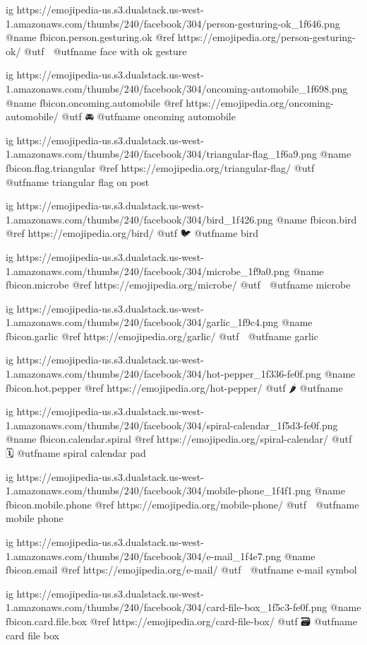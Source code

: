   ig https://emojipedia-us.s3.dualstack.us-west-1.amazonaws.com/thumbs/240/facebook/304/person-gesturing-ok_1f646.png
  @name fbicon.person.gesturing.ok
  @ref https://emojipedia.org/person-gesturing-ok/
  @utf 🙆
  @utfname face with ok gesture

  ig https://emojipedia-us.s3.dualstack.us-west-1.amazonaws.com/thumbs/240/facebook/304/oncoming-automobile_1f698.png
  @name fbicon.oncoming.automobile
  @ref https://emojipedia.org/oncoming-automobile/
  @utf 🚘
  @utfname oncoming automobile

  ig https://emojipedia-us.s3.dualstack.us-west-1.amazonaws.com/thumbs/240/facebook/304/triangular-flag_1f6a9.png
  @name fbicon.flag.triangular
  @ref https://emojipedia.org/triangular-flag/
  @utf 🚩
  @utfname triangular flag on post

  ig https://emojipedia-us.s3.dualstack.us-west-1.amazonaws.com/thumbs/240/facebook/304/bird_1f426.png
  @name fbicon.bird
  @ref https://emojipedia.org/bird/
  @utf 🐦
  @utfname bird

  ig https://emojipedia-us.s3.dualstack.us-west-1.amazonaws.com/thumbs/240/facebook/304/microbe_1f9a0.png
  @name fbicon.microbe
  @ref https://emojipedia.org/microbe/
  @utf 🦠
  @utfname microbe

  ig https://emojipedia-us.s3.dualstack.us-west-1.amazonaws.com/thumbs/240/facebook/304/garlic_1f9c4.png
  @name fbicon.garlic
  @ref https://emojipedia.org/garlic/
  @utf 🧄
  @utfname garlic

  ig https://emojipedia-us.s3.dualstack.us-west-1.amazonaws.com/thumbs/240/facebook/304/hot-pepper_1f336-fe0f.png
  @name fbicon.hot.pepper
  @ref https://emojipedia.org/hot-pepper/
  @utf 🌶️
  @utfname

  ig https://emojipedia-us.s3.dualstack.us-west-1.amazonaws.com/thumbs/240/facebook/304/spiral-calendar_1f5d3-fe0f.png
  @name fbicon.calendar.spiral
  @ref https://emojipedia.org/spiral-calendar/
  @utf 🗓
  @utfname spiral calendar pad

  ig https://emojipedia-us.s3.dualstack.us-west-1.amazonaws.com/thumbs/240/facebook/304/mobile-phone_1f4f1.png
  @name fbicon.mobile.phone
  @ref https://emojipedia.org/mobile-phone/
  @utf 📱
  @utfname mobile phone

  ig https://emojipedia-us.s3.dualstack.us-west-1.amazonaws.com/thumbs/240/facebook/304/e-mail_1f4e7.png
  @name fbicon.email
  @ref https://emojipedia.org/e-mail/
  @utf 📧
  @utfname e-mail symbol

  ig https://emojipedia-us.s3.dualstack.us-west-1.amazonaws.com/thumbs/240/facebook/304/card-file-box_1f5c3-fe0f.png
  @name fbicon.card.file.box
  @ref https://emojipedia.org/card-file-box/
  @utf 🗃
  @utfname card file box

